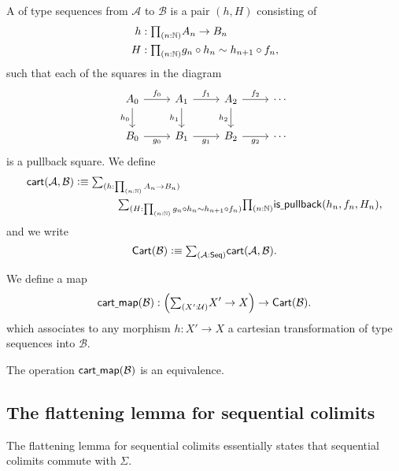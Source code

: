 \begin{defn}
A  of type sequences from $\mathcal{A}$ to $\mathcal{B}$ is a pair $(h,H)$ consisting of
\begin{align*}
h & : \prd{n:\N} A_n\to B_n \\
H & : \prd{n:\N} g_n\circ h_n \htpy h_{n+1}\circ f_n,
\end{align*}
such that each of the squares in the diagram
\begin{equation*}
\begin{tikzcd}
A_0 \arrow[d,swap,"h_0"] \arrow[r,"f_0"] & A_1 \arrow[d,swap,"h_1"] \arrow[r,"f_1"] & A_2 \arrow[d,swap,"h_2"] \arrow[r,"f_2"] & \cdots \\
B_0 \arrow[r,swap,"g_0"] & B_1 \arrow[r,swap,"g_1"] & B_2 \arrow[r,swap,"g_2"] & \cdots
\end{tikzcd}
\end{equation*}
is a pullback square. We define
\begin{align*}
\mathsf{cart}(\mathcal{A},\mathcal{B}) & \defeq\sm{h:\prd{n:\N}A_n\to B_n} \\
& \qquad\qquad \sm{H:\prd{n:\N}g_n\circ h_n\htpy h_{n+1}\circ f_n}\prd{n:\N}\mathsf{is\usc{}pullback}(h_n,f_n,H_n),
\end{align*}
and we write
\begin{equation*}
\mathsf{Cart}(\mathcal{B}) \defeq \sm{\mathcal{A}:\mathsf{Seq}}\mathsf{cart}(\mathcal{A},\mathcal{B}).
\end{equation*}
\end{defn}

\begin{defn}
We define a map
\begin{equation*}
\mathsf{cart\usc{}map}(\mathcal{B}) : \Big(\sm{X':\UU}X'\to X\Big)\to\mathsf{Cart}(\mathcal{B}).
\end{equation*}
which associates to any morphism $h:X'\to X$ a cartesian transformation of type sequences into $\mathcal{B}$.
\end{defn}

\begin{thm}
The operation $\mathsf{cart\underline{\ }{}map}(\mathcal{B})$ is an equivalence.
\end{thm}

\subsection{The flattening lemma for sequential colimits}

The flattening lemma for sequential colimits essentially states that sequential colimits commute with $\Sigma$. 

